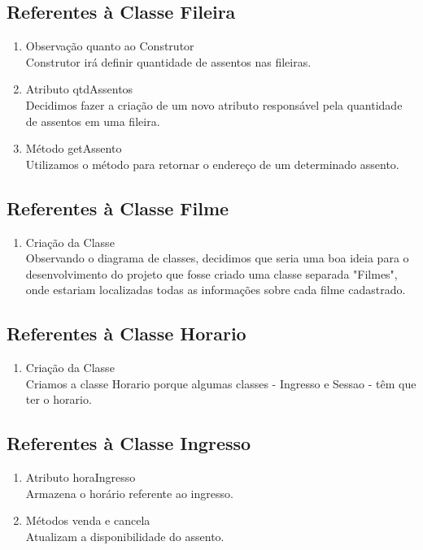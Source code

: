 \documentclass[a4paper]{article}
\begin{document}
\subsection{Referentes à Classe Fileira}
\begin{enumerate}

\item{Observação quanto ao Construtor}\\
Construtor irá definir quantidade de assentos nas fileiras.

\item{Atributo qtdAssentos}\\
Decidimos fazer a criação de um novo atributo responsável pela quantidade de assentos em uma fileira.

\item{Método getAssento}\\
Utilizamos o método para retornar o endereço de um determinado assento.

\end{enumerate}

\subsection{Referentes à Classe Filme}
\begin{enumerate}

\item{Criação da Classe}\\
Observando o diagrama de classes, decidimos que seria uma boa ideia para o desenvolvimento do projeto que fosse criado uma classe separada "Filmes", onde estariam localizadas todas as informações sobre cada filme cadastrado.

\end{enumerate}

\subsection{Referentes à Classe Horario}
\begin{enumerate}

\item{Criação da Classe}\\
Criamos a classe Horario porque algumas classes - Ingresso e Sessao - têm que ter o horario.

\end{enumerate}

\subsection{Referentes à Classe Ingresso}
\begin{enumerate}

\item{Atributo horaIngresso}\\
Armazena o horário referente ao ingresso.

\item{Métodos venda e cancela}\\
Atualizam a disponibilidade do assento.

\end{enumerate}
\end{document}
